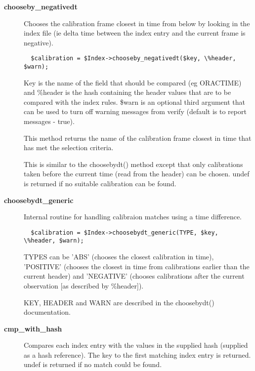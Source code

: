 \begin{description}
\item[\textbf{chooseby\_negativedt}] \mbox{}

Chooses the calibration frame closest in time from below by looking 
in the index file (ie delta time between the index entry and the 
current frame is negative).

\begin{verbatim}
  $calibration = $Index->chooseby_negativedt($key, \%header, $warn);
\end{verbatim}


Key is the name of the field that should be compared (eg ORACTIME)
and \%header is the hash containing the header values that are to
be compared with the index rules. \$warn is an optional third argument
that can be used to turn off warning messages from verify (default
is to report messages - true).



This method returns the name of the calibration frame closest in 
time that has met the selection criteria.



This is similar to the choosebydt() method except that only
calibrations taken before the current time (read from the
header) can be chosen. undef is returned if no suitable 
calibration can be found.


\item[\textbf{choosebydt\_generic}] \mbox{}

Internal routine for handling calibraion matches using a 
time difference.

\begin{verbatim}
  $calibration = $Index->choosebydt_generic(TYPE, $key, \%header, $warn);
\end{verbatim}


TYPES can be 'ABS' (chooses the closest calibration in time), 
'POSITIVE' (chooses the closest in time from calibrations earlier
than the current header) and 'NEGATIVE' (chooses calibrations after
the current observation [as described by \%header]).



KEY, HEADER and WARN are described in the choosebydt() documentation.


\item[\textbf{cmp\_with\_hash}] \mbox{}

Compares each index entry with the values in the supplied hash
(supplied as a hash reference). The key to the first matching 
index entry is returned. undef is returned if no match could be 
found.


\end{description}
